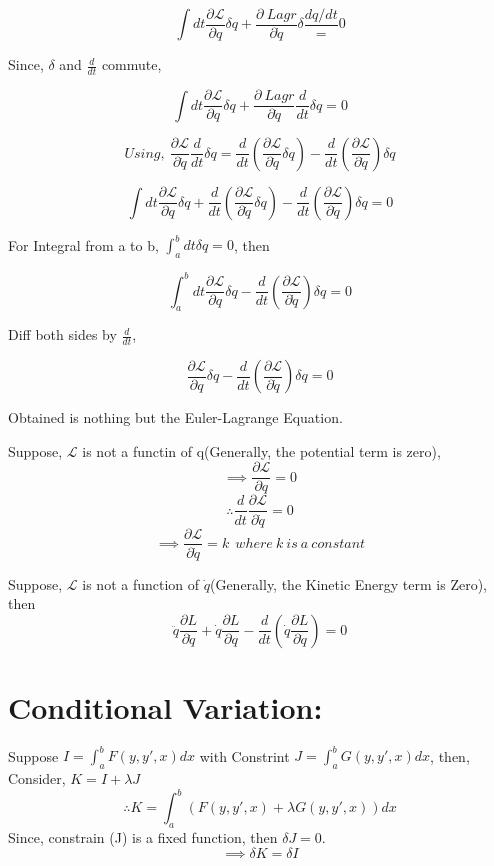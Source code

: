 \documentclass[a4paper]{article}
\newcommand{\Lagr}{\mathcal{L}}
\newcommand{\ddt}{\frac{d}{dt}}
\newcommand{\pdt}[2]{\frac{\partial #1}{\partial #2}}
\begin{document}
		$$ \int dt \frac{\partial\Lagr}{\partial q}\delta q + \frac{\partial\ Lagr}{\partial\dot{q}}\delta \frac{dq/dt} = 0 $$
		
		Since, $\delta$ and $\frac{d}{dt}$ commute,

		$$ \int dt \frac{\partial\Lagr}{\partial q}\delta q + \frac{\partial\ Lagr}{\partial\dot{q}}\ddt\delta q = 0 $$

		$$Using,\ \frac{\partial\Lagr}{\partial \dot{q}}\frac{d}{dt}\delta q = \ddt(\frac{\partial\Lagr}{\partial\dot{q}}\delta q) - \ddt(\frac{\partial\Lagr}{\partial\dot{q}}) \delta q $$

		$$ \int dt \frac{\partial\Lagr}{\partial q}\delta q + \ddt(\frac{\partial\Lagr}{\partial\dot{q}}\delta q) - \ddt(\frac{\partial\Lagr}{\partial\dot{q}}) \delta q = 0 $$

		For Integral from a to b, $\int_a^b dt \delta q = 0$, then

		$$ \int_a^b dt \frac{\partial\Lagr}{\partial q}\delta q - \ddt(\frac{\partial\Lagr}{\partial\dot{q}}) \delta q = 0 $$
		
		Diff both sides by $\ddt$,

		\begin{equation}
			\frac{\partial\Lagr}{\partial q}\delta q - \ddt(\frac{\partial\Lagr}{\partial\dot{q}}) \delta q = 0 \label{eq_E-L}
		\end{equation}

		Obtained is nothing but the Euler-Lagrange Equation.
		
		Suppose, $\Lagr$ is not a functin of q(Generally, the potential term is zero), 
		$$\implies \frac{\partial\Lagr}{\partial q} = 0 $$
		$$\therefore \ddt\frac{\partial\Lagr}{\partial \dot{q}} = 0 $$
		$$\implies \frac{\partial\Lagr}{\partial \dot{q}} = k\ \ where\ k\ is\ a\ constant$$ 

		Suppose, $\Lagr$ is not a function of $\dot{q}$(Generally, the Kinetic Energy term is Zero), then
		$$ \ddot{q}\pdt{L}{\dot{q}} + \dot{q}\pdt{L}{q} - \ddt(\dot{q}\pdt{L}{\dot{q}}) = 0$$

	\section*{Conditional Variation: }
		
		\noindent

		Suppose $ I = \int_a^b F(y, y', x) dx $ with Constrint $ J = \int_a^b G(y, y', x) dx $, then, \hfill \\

		Consider, $ K = I + \lambda J $
		$$\therefore K = \int_a^b (F(y, y', x) + \lambda G(y, y', x)) dx $$
		Since, constrain (J) is a fixed function, then $\delta J =0 $.
		$$\implies \delta K = \delta I $$
\end{document}
